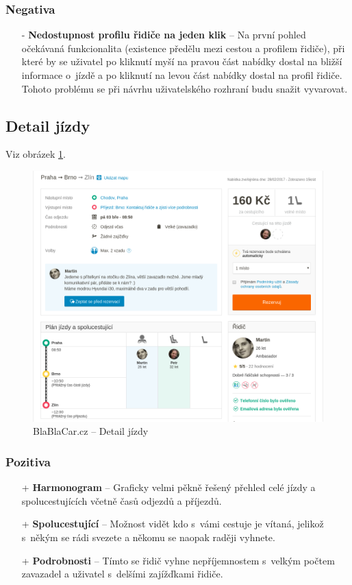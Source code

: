 \subsubsection*{Negativa}
\begin{itemize}
    \item[-] \textbf{Nedostupnost profilu řidiče na jeden klik} -- Na první pohled očekávaná funkcionalita (existence předělu mezi cestou a profilem řidiče), při které by se uživatel po kliknutí myší na pravou část nabídky dostal na bližší informace o~jízdě a po kliknutí na levou část nabídky dostal na profil řidiče. Tohoto problému se při návrhu uživatelského rozhraní budu snažit vyvarovat.
\end{itemize}



\newpage
\subsection{Detail jízdy}
Viz obrázek \ref{fig:blablacar:detail}.
\begin{figure}[h]
    \centering
    \includegraphics[width=1.0\textwidth]{media/blablacar/detail.png}
    \caption{BlaBlaCar.cz -- Detail jízdy}
    \label{fig:blablacar:detail}
\end{figure}
\subsubsection*{Pozitiva}
\begin{itemize}
    \item[+] \textbf{Harmonogram} -- Graficky velmi pěkně řešený přehled celé jízdy a spolucestujících včetně časů odjezdů a příjezdů.
    \item[+] \textbf{Spolucestující} -- Možnost vidět kdo s~vámi cestuje je vítaná, jelikož s~někým se rádi svezete a někomu se naopak raději vyhnete.
    \item[+] \textbf{Podrobnosti} -- Tímto se řidič vyhne nepříjemnostem s~velkým počtem zavazadel a uživatel s~delšími zajížďkami řidiče.
\end{itemize}
